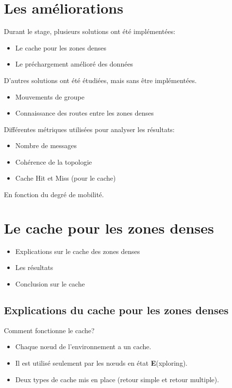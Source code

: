 \documentclass{beamer}
\begin{document}
  \section{Les améliorations}
  \begin{frame}
	Durant le stage, plusieurs solutions ont été implémentées:
	\begin{itemize}
		\pause\item Le cache pour les zones denses
		\pause\item Le préchargement amélioré des données
	\end{itemize}
	\pause D'autres solutions ont été étudiées, mais sans être implémentées.
	\begin{itemize}
		\item Mouvements de groupe
		\item Connaissance des routes entre les zones denses
	\end{itemize}
  \end{frame}

  \begin{frame}
	Différentes métriques utilisées pour analyser les résultats:
	\begin{itemize}
		\item Nombre de messages
		\item Cohérence de la topologie
		\item Cache Hit et Miss (pour le cache)
	\end{itemize}
	\vspace{5mm}
	En fonction du degré de mobilité.
  \end{frame}

  \section{Le cache pour les zones denses}
  \begin{frame}
	\vspace{1cm}
	\begin{itemize}
		\item Explications sur le cache des zones denses
		\item Les résultats 
		\item Conclusion sur le cache
	\end{itemize}
  \end{frame}
  
  \subsection{Explications du cache pour les zones denses}
  \begin{frame}
	Comment fonctionne le cache?
	\begin{itemize}
 		\item Chaque nœud de l'environnement a un cache.
		\item Il est utilisé seulement par les nœuds en état \textbf{E}(xploring).
		\item Deux types de cache mis en place (retour simple et retour multiple).
	\end{itemize}
  \end{frame}
\end{document}
